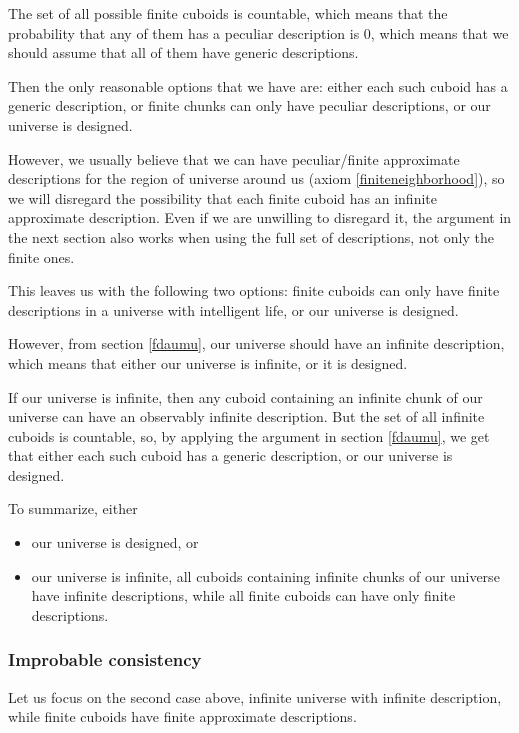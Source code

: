 \documentclass[a4paper
,draft
]{article}
\begin{document}
The set of all possible finite cuboids is countable,
which means that the probability that any of them has a peculiar
description is $0$, which means that we should assume that all of them
have generic descriptions.

Then the only reasonable options that we have are:
either each such cuboid has a generic description,
or finite chunks can only have peculiar descriptions,
or our universe is designed.

However, we usually believe that we can have peculiar/finite
approximate descriptions
for the region of universe around us (axiom \ref{finiteneighborhood}), so we
will disregard the possibility that each finite cuboid has an
infinite approximate description. Even if we are unwilling to disregard it,
the argument in the next section also works when using the full set of
descriptions, not only the finite ones.

This leaves us with the following
two options: finite cuboids can
only have finite descriptions in a universe with intelligent life, or our
universe is designed.

However, from section \ref{fdaumu}, our universe should have an
infinite description, which means that either our universe is infinite,
or it is designed.

If our universe is infinite,
then any cuboid containing an infinite chunk of our universe can have
an observably infinite description.
But the set of all infinite cuboids is countable, so, by applying the argument
in section \ref{fdaumu}, we get that either each such cuboid has a generic
description, or our universe is designed.

To summarize, either
\begin{itemize}
  \item our universe is designed, or
  \item our universe is infinite, all cuboids containing infinite chunks of
        our universe have infinite descriptions,
        while all finite cuboids can have only finite descriptions.
\end{itemize}

\subsubsection{Improbable consistency}
\label{sec:improbableconsistency}

Let us focus on the second case above, infinite universe with infinite
description, while finite cuboids have finite approximate
descriptions.
\end{document}
